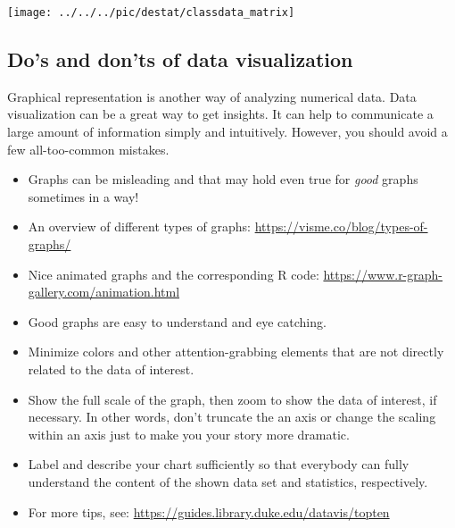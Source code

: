 \begin{center}
\texttt{[image: ../../../pic/destat/classdata\_matrix]}
\end{center}



\subsection*{Do's and don'ts of data visualization}

 Graphical representation is another way of analyzing numerical
data.
Data visualization can be a great way to get insights. It can help to communicate a large amount of information simply and intuitively. However, you should avoid a few all-too-common mistakes.

\begin{itemize}
\item Graphs can be misleading and that may hold even true for \textit{good} graphs sometimes in a way!
\item An overview of different types of graphs: \url{https://visme.co/blog/types-of-graphs/}
\item Nice animated graphs and the corresponding R code: \url{https://www.r-graph-gallery.com/animation.html}
\item Good graphs are easy to understand and eye catching.
\item Minimize colors and other attention-grabbing elements that are not directly related to the data of interest.
\item Show the full scale of the graph, then zoom to show the data of interest, if necessary. In other words, don't truncate the an axis or change the scaling within an axis just to make you your story more dramatic.
\item Label and describe your chart sufficiently so that everybody can fully understand the content of the shown data set and statistics, respectively.
\item For more tips, see: \url{https://guides.library.duke.edu/datavis/topten}
\end{itemize}





